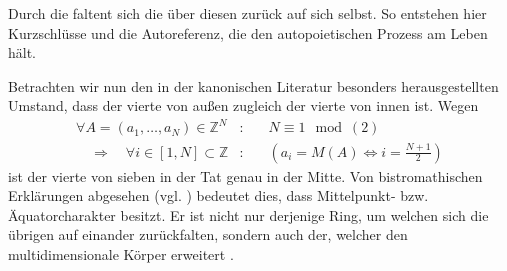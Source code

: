 \begin{newstuff}
    Durch die  faltent sich die  über diesen  zurück auf sich selbst. So entstehen hier Kurzschlüsse und die Autoreferenz, die den autopoietischen Prozess am Leben hält. 

    Betrachten wir nun den in der kanonischen Literatur besonders herausgestellten Umstand, dass der vierte  von außen zugleich der vierte von innen ist. Wegen
        \begin{equation}
        \begin{array}{rcl}
            \forall A = (a_1,\ldots,a_N) \in \mathbb{Z}^N&:&
            \quad
            N\equiv 1\mod(2)\\
            \quad\Rightarrow\quad
            \forall i \in [1,N] \subset \mathbb{Z}&:&
            \quad
            \left(
            a_i = M(A) \Leftrightarrow i = \frac{N+1}{2}
            \right)
        \end{array}
        \end{equation}
    ist der vierte  von sieben in der Tat genau in der Mitte.
    Von bistromathischen  Erklärungen abgesehen (vgl. \cite[Kap. 4]{adams_life})  bedeutet dies, dass   Mittelpunkt- bzw. Äquatorcharakter besitzt. 
    Er ist nicht nur derjenige Ring, um welchen sich die übrigen  auf einander zurückfalten, sondern auch der, welcher den multidimensionale Körper erweitert . 
\end{newstuff}